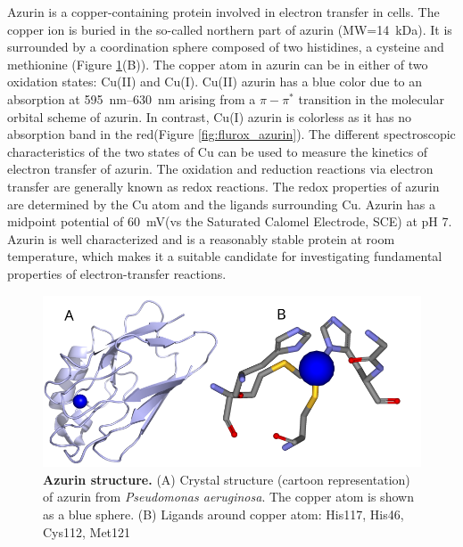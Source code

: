 Azurin is a copper-containing protein involved in electron transfer in cells.\cite{dennison2005investigating,kolczak2006handbook}
The copper ion is buried in the so-called northern part of azurin (MW=\SI{14}{\kilo\dalton}).
It is surrounded by a coordination sphere composed of two histidines, a cysteine and methionine (Figure \ref{fig:azurin_structure}(B)).
The copper atom in azurin can be in either of two oxidation states: Cu(II) and Cu(I).
Cu(II) azurin has a blue color due to an absorption at \SIrange{595}{630}{\nm} arising from a $\pi - \pi^*$ transition in the molecular orbital scheme of azurin.\cite{dooley1981spectroscopic,schmauder2005sensitive}
In contrast, Cu(I) azurin is colorless as it has no absorption band in the red(Figure \ref{fig:flurox_azurin}).
The different spectroscopic characteristics of the two states of Cu can be used to measure the kinetics of electron transfer of azurin.
The oxidation and reduction reactions via electron transfer are generally known as redox reactions.
The redox properties of azurin are determined by the Cu atom and the ligands surrounding Cu.
Azurin has a midpoint potential of \SI{60}{\mV}(vs the Saturated Calomel Electrode, SCE) at pH 7.
Azurin is well characterized and is a reasonably stable protein at room temperature, which makes it a suitable candidate for investigating fundamental properties of electron-transfer reactions.
\begin{figure}
	\centering
	\includegraphics[width=\textwidth]{azurin_structure}
	\caption{\textbf{Azurin structure.} (A) Crystal structure (cartoon representation) of azurin from \textit{Pseudomonas aeruginosa}.\cite{adman1981structural}
	The copper atom is shown as a blue sphere.
	(B) Ligands around copper atom: His117, His46, Cys112, Met121}
	\label{fig:azurin_structure}
\end{figure}

